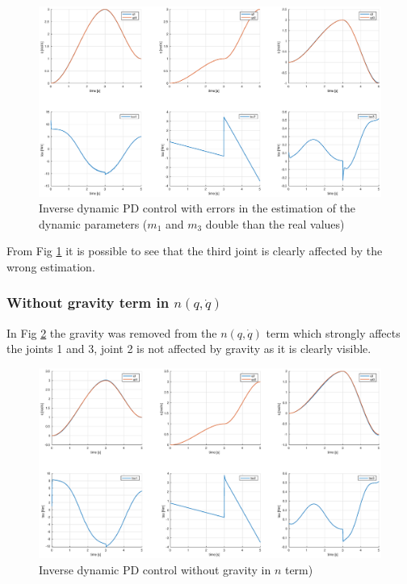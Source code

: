 \documentclass[a4paper,12pt]{article}
\begin{document}
\begin{figure}[H]
    \begin{center}
        \hspace*{-4.5cm}
        \includegraphics[scale=0.5]{images/inv_dyn_app.eps}
    \end{center}
    \caption{Inverse dynamic PD control with errors in the estimation of the dynamic parameters ($m_1$ and $m_3$ double than the real values)}
    \label{fig:inv_dyn_app}
\end{figure}

From Fig \ref{fig:inv_dyn_app} it is possible to see that the third joint is clearly affected by the wrong estimation. 

\subsubsection{Without gravity term in $n(q,\dot{q})$}

In Fig \ref{fig:inv_dyn_no_grav} the gravity was removed from the $n(q,\dot{q})$ term which strongly affects the joints 1 and 3, joint 2 is not affected by gravity as it is clearly visible.

\begin{figure}[H]
    \begin{center}
        \hspace*{-4.5cm}
        \includegraphics[scale=0.5]{images/inv_dyn_no_grav.eps}
    \end{center}
    \caption{Inverse dynamic PD control without gravity in $n$ term)}
    \label{fig:inv_dyn_no_grav}
\end{figure}
\end{document}
